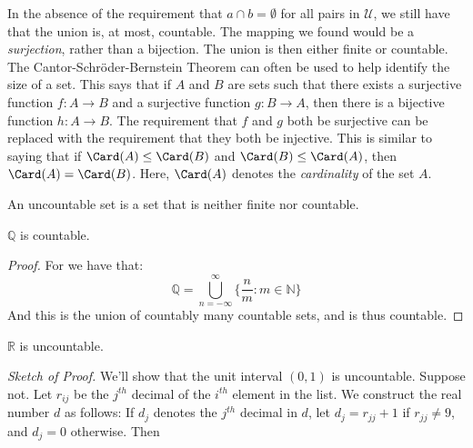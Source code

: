            In the absence of the requirement that
            $a\cap{b}=\emptyset$ for all pairs in $\mathcal{U}$,
            we still have that the union is, at most, countable.
            The mapping we found would be a
            \textit{surjection}, rather than a bijection.
            The union is then either finite or countable. The
            Cantor-Schr\"{o}der-Bernstein Theorem can often be
            used to help identify the size of a set. This says
            that if $A$ and $B$ are sets such that there exists
            a surjective function $f:A\rightarrow{B}$ and a
            surjective function $g:B\rightarrow{A}$, then there
            is a bijective function $h:A\rightarrow{B}$. The
            requirement that $f$ and $g$ both be surjective
            can be replaced with the requirement that they both
            be injective. This is similar to saying that if
            $\Card(A)\leq\Card(B)$ and $\Card(B)\leq\Card(A)$,
            then $\Card(A)=\Card(B)$. Here, $\Card(A)$ denotes
            the \textit{cardinality} of the set $A$.
            \begin{definition}
                An uncountable set is a set that is
                neither finite nor countable.
            \end{definition}
            \begin{theorem}
                $\mathbb{Q}$ is countable.
            \end{theorem}
            \begin{proof}
                For we have that:
                \begin{equation}
                    \mathbb{Q}=
                    \bigcup_{n=-\infty}^{\infty}
                    \Big\{\frac{n}{m}:m\in\mathbb{N}\Big\}
                \end{equation}
                And this is the union of countably
                many countable sets, and is thus countable.
            \end{proof}
            \begin{theorem}
                $\mathbb{R}$ is uncountable.
            \end{theorem}
            \textit{Sketch of Proof.} We'll show that the unit
            interval $(0,1)$ is uncountable. Suppose not.
            Let $r_{ij}$ be the $j^{th}$ decimal of the $i^{th}$
            element in the list. We construct the real number
            $d$ as follows: If $d_{j}$ denotes the $j^{th}$
            decimal in $d$, let $d_{j}=r_{jj}+1$ if
            $r_{jj}\ne{9}$, and $d_{j}=0$ otherwise. Then
